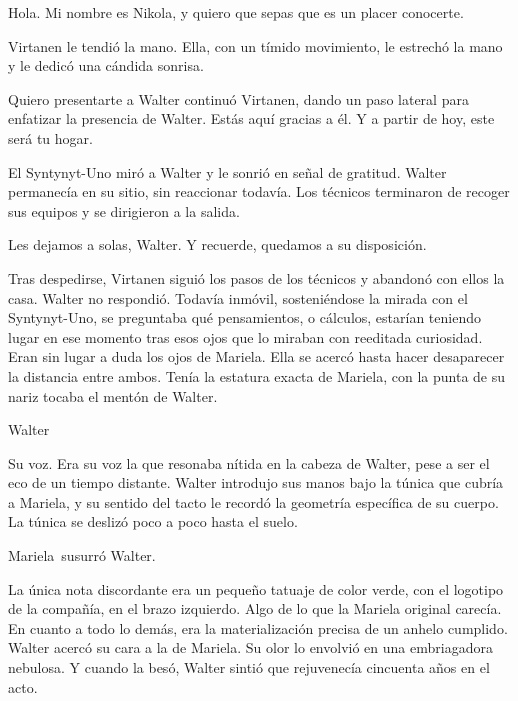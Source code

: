 \reply Hola. Mi nombre es Nikola, y quiero que sepas que es un placer conocerte.

Virtanen le tendió la mano. Ella, con un tímido movimiento, le estrechó la mano y le dedicó una cándida sonrisa.

\reply Quiero presentarte a Walter \pause continuó Virtanen, dando un paso lateral para enfatizar la presencia de Walter\pauseend. Estás aquí gracias a él. Y a partir de hoy, este será tu hogar.

El Syntynyt-Uno miró a Walter y le sonrió en señal de gratitud. Walter permanecía en su sitio, sin reaccionar todavía. Los técnicos terminaron de recoger sus equipos y se dirigieron a la salida. 

\reply Les dejamos a solas, Walter. Y recuerde, quedamos a su disposición.

Tras despedirse, Virtanen siguió los pasos de los técnicos y abandonó con ellos la casa. Walter no respondió. Todavía inmóvil, sosteniéndose la mirada con el Syntynyt-Uno, se preguntaba qué pensamientos, o cálculos, estarían teniendo lugar en ese momento tras esos ojos que lo miraban con reeditada curiosidad. Eran sin lugar a duda los ojos de Mariela. Ella se acercó hasta hacer desaparecer la distancia entre ambos. Tenía la estatura exacta de Mariela, con la punta de su nariz tocaba el mentón de Walter.

\reply Walter\textellipsis

Su voz. Era su voz la que resonaba nítida en la cabeza de Walter, pese a ser el eco de un tiempo distante. Walter introdujo sus manos bajo la túnica que cubría a Mariela, y su sentido del tacto le recordó la geometría específica de su cuerpo. La túnica se deslizó poco a poco hasta el suelo.

\reply Mariela\textellipsis\ \pause susurró Walter.

La única nota discordante era un pequeño tatuaje de color verde, con el logotipo de la compañía, en el brazo izquierdo. Algo de lo que la Mariela original carecía. En cuanto a todo lo demás, era la materialización precisa de un anhelo cumplido. Walter acercó su cara a la de Mariela. Su olor lo envolvió en una embriagadora nebulosa. Y cuando la besó, Walter sintió que rejuvenecía cincuenta años en el acto.
